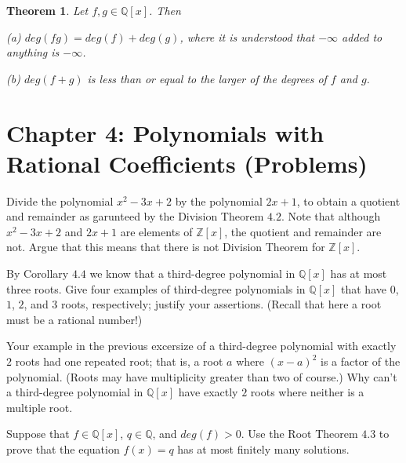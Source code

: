 \documentclass[8pt]{article}
\newtheorem{theorem}{Theorem}
\begin{document}
\begin{theorem}
    Let $f, g \in \mathbb{Q}[x]$. Then

    (a) $deg(fg) = deg(f) + deg(g)$, where it is understood that $-\infty$
        added to anything is $-\infty$.
    
    (b) $deg(f + g)$ is less than or equal to the larger of the degrees of $f$
        and $g$.
\end{theorem}

\section{Chapter 4: Polynomials with Rational Coefficients (Problems)}

\begin{tcolorbox}[title=Problem 2, breakable]
    Divide the polynomial $x^2 - 3x + 2$ by the polynomial $2x + 1$,
    to obtain a quotient and remainder as garunteed by the Division 
    Theorem $4.2$. Note that although $x^2 - 3x + 2$ and $2x + 1$ are 
    elements of $\mathbb{Z}[x]$, the quotient and remainder are not.
    Argue that this means that there is not Division Theorem for $\mathbb{Z}[x]$.
\end{tcolorbox}

\begin{tcolorbox}[title=Problem 3, breakable]
    By Corollary $4.4$ we know that a third-degree polynomial in $\mathbb{Q}[x]$
    has at most three roots. Give four examples of third-degree polynomials in 
    $\mathbb{Q}[x]$ that have $0$, $1$, $2$, and $3$ roots, respectively; justify
    your assertions. (Recall that here a root must be a rational number!)
\end{tcolorbox}

\begin{tcolorbox}[title=Problem 4, breakable]
    Your example in the previous excersize of a third-degree polynomial with 
    exactly $2$ roots had one repeated root; that is, a root $a$ where $(x - a)^2$
    is a factor of the polynomial. (Roots may have multiplicity greater than two 
    of course.) Why can't a third-degree polynomial in $\mathbb{Q}[x]$ have 
    exactly $2$ roots where neither is a multiple root.
\end{tcolorbox}

\begin{tcolorbox}[title=Problem 6, breakable]
    Suppose that $f \in \mathbb{Q}[x]$, $q \in \mathbb{Q}$,
    and $deg(f) > 0$. Use the Root Theorem $4.3$ to prove that
    the equation $f(x) = q$ has at most finitely many solutions.
\end{tcolorbox}
\end{document}

